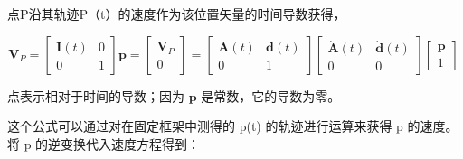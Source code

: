 点P沿其轨迹P（t）的速度作为该位置矢量的时间导数获得，

\begin{equation}
\mathbf{V}_P = 
\begin{bmatrix}
\mathbf{I}(t) & 0 \\
0 & 1 
\end{bmatrix}
\mathbf{p} = 
\begin{bmatrix}
\mathbf{V}_P \\
0
\end{bmatrix} = 
\begin{bmatrix}
\mathbf{A}(t) & \mathbf{d}(t) \\
0 & 1 
\end{bmatrix}
\begin{bmatrix}
\dot{\mathbf{A}}(t) & \dot{\mathbf{d}}(t) \\
0 & 0
\end{bmatrix}
\begin{bmatrix}
\mathbf{p} \\
1
\end{bmatrix}~
\end{equation}

\noindent 点表示相对于时间的导数；因为 $\mathbf{p}$ 是常数，它的导数为零。

这个公式可以通过对在固定框架中测得的 p(t) 的轨迹进行运算来获得 p 的速度。将 p 的逆变换代入速度方程得到：

